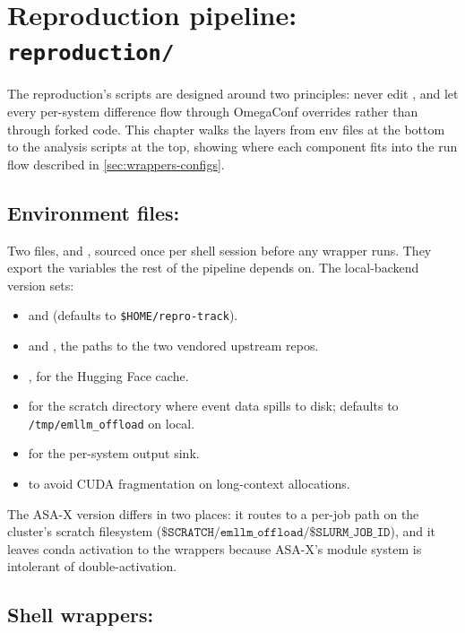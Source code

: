 \section{Reproduction pipeline: \texttt{reproduction/}}
\label{sec:repro-pipeline}

The reproduction's scripts are designed around two principles: never edit , and let every per-system difference flow through OmegaConf overrides rather than through forked code. This chapter walks the layers from env files at the bottom to the analysis scripts at the top, showing where each component fits into the run flow described in \cref{sec:wrappers-configs}.

\subsection{Environment files: }
\label{sec:repro-env}

Two files,  and , sourced once per shell session before any wrapper runs. They export the variables the rest of the pipeline depends on. The local-backend version sets:
\begin{itemize}
  \item {} and  (defaults to \texttt{\$HOME/repro-track}).
  \item {} and , the paths to the two vendored upstream repos.
  \item {},  for the Hugging Face cache.
  \item {} for the scratch directory where event data spills to disk; defaults to \texttt{/tmp/emllm\_offload} on local.
  \item {} for the per-system output sink.
  \item {} to avoid CUDA fragmentation on long-context allocations.
\end{itemize}
The ASA-X version differs in two places: it routes  to a per-job path on the cluster's scratch filesystem ($\texttt{\$SCRATCH/emllm\_offload/\$SLURM\_JOB\_ID}$), and it leaves conda activation to the wrappers because ASA-X's module system is intolerant of double-activation.

\subsection{Shell wrappers: }
\label{sec:repro-shell}

